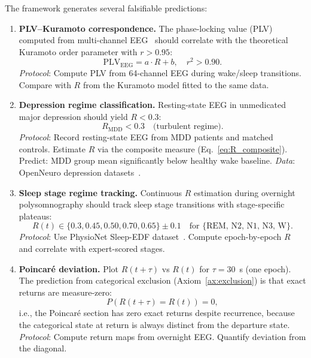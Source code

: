 \documentclass[aps,prd,twocolumn,superscriptaddress,floatfix,nofootinbib]{revtex4-2}
\theoremstyle{remark}
\newcommand{\Rorder}{R}
\begin{document}
The framework generates several falsifiable predictions:

\begin{enumerate}
    \item \textbf{PLV--Kuramoto correspondence.} The phase-locking value (PLV) computed from multi-channel EEG~\cite{lachaux1999measuring} should correlate with the theoretical Kuramoto order parameter with $r > 0.95$:
    \begin{equation}
        \text{PLV}_{\text{EEG}} = a \cdot \Rorder + b, \quad r^2 > 0.90.
        \label{eq:plv_prediction}
    \end{equation}
    \textit{Protocol}: Compute PLV from 64-channel EEG during wake/sleep transitions. Compare with $\Rorder$ from the Kuramoto model fitted to the same data.

    \item \textbf{Depression regime classification.} Resting-state EEG in unmedicated major depression should yield $\Rorder < 0.3$:
    \begin{equation}
        \Rorder_{\text{MDD}} < 0.3 \quad \text{(turbulent regime)}.
        \label{eq:depression_prediction}
    \end{equation}
    \textit{Protocol}: Record resting-state EEG from MDD patients and matched controls. Estimate $\Rorder$ via the composite measure (Eq.~\ref{eq:R_composite}). Predict: MDD group mean significantly below healthy wake baseline.
    \textit{Data}: OpenNeuro depression datasets~\cite{markiewicz2021openneuro}.

    \item \textbf{Sleep stage regime tracking.} Continuous $\Rorder$ estimation during overnight polysomnography should track sleep stage transitions with stage-specific plateaus:
    \begin{equation}
        \Rorder(t) \in \{0.3, 0.45, 0.50, 0.70, 0.65\} \pm 0.1 \quad \text{for \{REM, N2, N1, N3, W\}}.
        \label{eq:tracking_prediction}
    \end{equation}
    \textit{Protocol}: Use PhysioNet Sleep-EDF dataset~\cite{kemp2000analysis,goldberger2000physiobank}. Compute epoch-by-epoch $\Rorder$ and correlate with expert-scored stages.

    \item \textbf{Poincar\'e deviation.} Plot $\Rorder(t+\tau)$ vs $\Rorder(t)$ for $\tau = 30$~s (one epoch). The prediction from categorical exclusion (Axiom~\ref{ax:exclusion}) is that exact returns are measure-zero:
    \begin{equation}
        P(\Rorder(t+\tau) = \Rorder(t)) = 0,
        \label{eq:poincare_prediction}
    \end{equation}
    i.e., the Poincar\'e section has zero exact returns despite recurrence, because the categorical state at return is always distinct from the departure state.
    \textit{Protocol}: Compute return maps from overnight EEG. Quantify deviation from the diagonal.


\end{enumerate}
\end{document}
